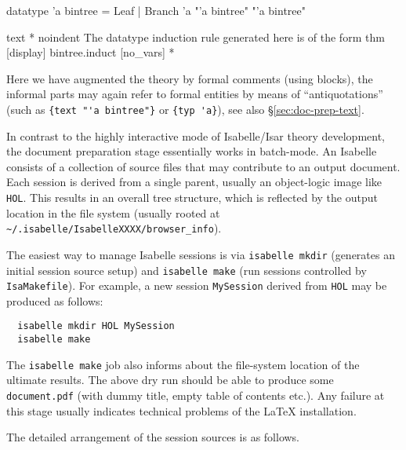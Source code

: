 \begin{isabellebody}
\begin{isamarkuptext}
\begin{ttbox}
  datatype 'a bintree =
    Leaf | Branch 'a  "'a bintree"  "'a bintree"
  \end{ttbox}
  \begin{ttbox}
  text {\ttlbrace}*
    {\ttback}noindent The datatype induction rule generated here is
    of the form {\at}{\ttlbrace}thm [display] bintree.induct [no_vars]{\ttrbrace}
  *{\ttrbrace}
  \end{ttbox}\vspace{-\medskipamount}

  \noindent Here we have augmented the theory by formal comments
  (using  blocks), the informal parts may again refer
  to formal entities by means of ``antiquotations'' (such as
  \texttt{\at}\verb,{text "'a bintree"}, or
  \texttt{\at}\verb,{typ 'a},), see also \S\ref{sec:doc-prep-text}.%
\end{isamarkuptext}%
\isamarkuptrue%
%
\isamarkuptrue%
%
\begin{isamarkuptext}%
In contrast to the highly interactive mode of Isabelle/Isar theory
  development, the document preparation stage essentially works in
  batch-mode.  An Isabelle  consists of a collection
  of source files that may contribute to an output document.  Each
  session is derived from a single parent, usually an object-logic
  image like \texttt{HOL}.  This results in an overall tree structure,
  which is reflected by the output location in the file system
  (usually rooted at \verb,~/.isabelle/IsabelleXXXX/browser_info,).

  \medskip The easiest way to manage Isabelle sessions is via
  \texttt{isabelle mkdir} (generates an initial session source setup)
  and \texttt{isabelle make} (run sessions controlled by
  \texttt{IsaMakefile}).  For example, a new session
  \texttt{MySession} derived from \texttt{HOL} may be produced as
  follows:

\begin{verbatim}
  isabelle mkdir HOL MySession
  isabelle make
\end{verbatim}

  The \texttt{isabelle make} job also informs about the file-system
  location of the ultimate results.  The above dry run should be able
  to produce some \texttt{document.pdf} (with dummy title, empty table
  of contents etc.).  Any failure at this stage usually indicates
  technical problems of the {\LaTeX} installation.

  \medskip The detailed arrangement of the session sources is as
  follows.


\end{isamarkuptext}
\end{isabellebody}
